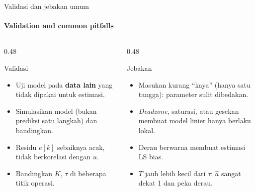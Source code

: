 \documentclass[aspectratio=169,10pt]{beamer}
\begin{document}
\begin{frame}{Validasi dan jebakan umum}
	\framesubtitle{Validation and common pitfalls}
	\begin{columns}[T]
		\begin{column}{0.48\textwidth}
			\begin{block}{Validasi}
				\small
				\begin{itemize}
					\item Uji model pada \textbf{data lain} yang tidak dipakai untuk estimasi.
					\item Simulasikan model (bukan prediksi satu langkah) dan bandingkan.
					\item Residu $e[k]$ sebaiknya acak, tidak berkorelasi dengan $u$.
					\item Bandingkan $K$, $\tau$ di beberapa titik operasi.
				\end{itemize}
			\end{block}
		\end{column}
		\begin{column}{0.48\textwidth}
			\begin{alertblock}{Jebakan}
				\small
				\begin{itemize}
					\item Masukan kurang ``kaya'' (hanya satu tangga): parameter sulit dibedakan.
					\item \textit{Deadzone}, saturasi, atau gesekan membuat model linier hanya berlaku lokal.
					\item Derau berwarna membuat estimasi LS bias.
					\item $T$ jauh lebih kecil dari $\tau$: $\hat a$ sangat dekat 1 dan peka derau.
				\end{itemize}
			\end{alertblock}
		\end{column}
	\end{columns}
\end{frame}
\end{document}
